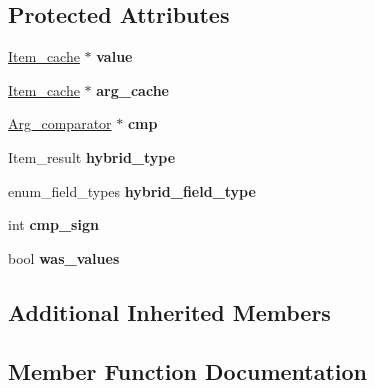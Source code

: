 \subsection*{Protected Attributes}
\begin{DoxyCompactItemize}
\item 
\mbox{\label{classItem__sum__hybrid_ae0b4d456aa9540ce06dc316a39705eb5}} 
\mbox{\hyperlink{classItem__cache}{Item\+\_\+cache}} $\ast$ {\bfseries value}
\item 
\mbox{\label{classItem__sum__hybrid_a6df9f0f051683b5dab75ca3d00a61be3}} 
\mbox{\hyperlink{classItem__cache}{Item\+\_\+cache}} $\ast$ {\bfseries arg\+\_\+cache}
\item 
\mbox{\label{classItem__sum__hybrid_ac8dec3b182fb3acf747d257a25e22872}} 
\mbox{\hyperlink{classArg__comparator}{Arg\+\_\+comparator}} $\ast$ {\bfseries cmp}
\item 
\mbox{\label{classItem__sum__hybrid_a93c752350ce88e28ad877a6a9087b5ad}} 
Item\+\_\+result {\bfseries hybrid\+\_\+type}
\item 
\mbox{\label{classItem__sum__hybrid_a968aa48d2105f73be8b26702d2b8499a}} 
enum\+\_\+field\+\_\+types {\bfseries hybrid\+\_\+field\+\_\+type}
\item 
\mbox{\label{classItem__sum__hybrid_a25bf83667acdf87f2b93f933b77c7aef}} 
int {\bfseries cmp\+\_\+sign}
\item 
\mbox{\label{classItem__sum__hybrid_a9d92c7c82daa1e96eb2dfad70d854e93}} 
bool {\bfseries was\+\_\+values}
\end{DoxyCompactItemize}
\subsection*{Additional Inherited Members}


\subsection{Member Function Documentation}
\mbox{\label{classItem__sum__hybrid_ad7d563ebdca9c58beec529763623c3fb}} 

